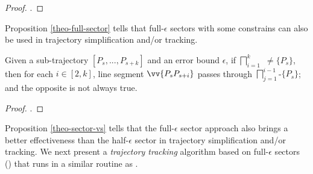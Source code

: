 \begin{proof}
	\todo.
\end{proof}

Proposition \ref{theo-full-sector} tells that full-$\epsilon$ sectors with some constrains can also be used in trajectory simplification and/or tracking. 

\begin{proposition}
	\label{theo-sector-vs}
	Given a sub-trajectory $[P_s,...,P_{s+k}]$ and an error bound $\epsilon$, if $\bigsqcap_{i=1}^{k}$ $\ne \{P_s\}$, then for each $i \in [2, k]$, line segment $\vv{P_sP_{s+i}}$ passes through $\bigsqcap_{j=1}^{i-1}$-$\{P_s\}$; and the opposite is not always true.
\end{proposition}

\begin{proof}
	\todo.
\end{proof}

Proposition \ref{theo-sector-vs} tells that the full-$\epsilon$ sector approach also brings a better effectiveness than the half-$\epsilon$ sector in trajectory simplification and/or tracking.
We next present a {\em trajectory tracking} algorithm based on full-$\epsilon$ sectors (\sitt) that runs in a similar routine as \citt. 

